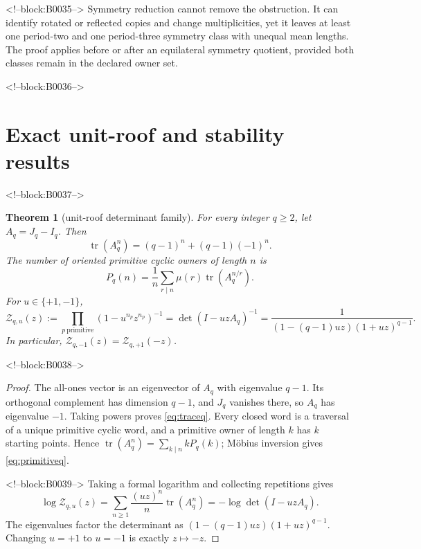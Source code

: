 \documentclass[11pt,a4paper]{article}
\newtheorem{theorem}{Theorem}[section]
\theoremstyle{definition}
\theoremstyle{remark}
\newcommand{\tr}{\operatorname{tr}}
\newcommand{\Zeta}{\mathcal Z}
\begin{document}
<!--block:B0035-->
Symmetry reduction cannot remove the obstruction. It can identify rotated or reflected copies and change multiplicities, yet it leaves at least one period-two and one period-three symmetry class with unequal mean lengths. The proof applies before or after an equilateral symmetry quotient, provided both classes remain in the declared owner set.

<!--block:B0036-->
\section{Exact unit-roof and stability results}

<!--block:B0037-->
\begin{theorem}[unit-roof determinant family]\label{thm:qfamily}
For every integer \(q\ge2\), let \(A_q=J_q-I_q\). Then
\begin{equation}\label{eq:traceq}
 \tr(A_q^n)=(q-1)^n+(q-1)(-1)^n.
\end{equation}
The number of oriented primitive cyclic owners of length \(n\) is
\begin{equation}\label{eq:primitiveq}
 P_q(n)=\frac1n\sum_{r\mid n}\mu(r)\tr(A_q^{n/r}).
\end{equation}
For \(u\in\{+1,-1\}\),
\begin{equation}\label{eq:zetaq}
 \Zeta_{q,u}(z)
 :=\prod_{p\ \mathrm{primitive}}\left(1-u^{n_p}z^{n_p}\right)^{-1}
 =\det(I-uzA_q)^{-1}
 =\frac{1}{(1-(q-1)uz)(1+uz)^{q-1}}.
\end{equation}
In particular, \(\Zeta_{q,-1}(z)=\Zeta_{q,+1}(-z)\).
\end{theorem}

<!--block:B0038-->
\begin{proof}
The all-ones vector is an eigenvector of \(A_q\) with eigenvalue \(q-1\). Its orthogonal complement has dimension \(q-1\), and \(J_q\) vanishes there, so \(A_q\) has eigenvalue \(-1\). Taking powers proves \cref{eq:traceq}. Every closed word is a traversal of a unique primitive cyclic word, and a primitive owner of length \(k\) has \(k\) starting points. Hence
\(\tr(A_q^n)=\sum_{k\mid n}kP_q(k)\); Möbius inversion gives \cref{eq:primitiveq}.

<!--block:B0039-->
Taking a formal logarithm and collecting repetitions gives
\[
 \log\Zeta_{q,u}(z)
 =\sum_{n\ge1}\frac{(uz)^n}{n}\tr(A_q^n)
 =-\log\det(I-uzA_q).
\]
The eigenvalues factor the determinant as
\((1-(q-1)uz)(1+uz)^{q-1}\). Changing \(u=+1\) to \(u=-1\) is exactly \(z\mapsto-z\).
\end{proof}
\end{document}

